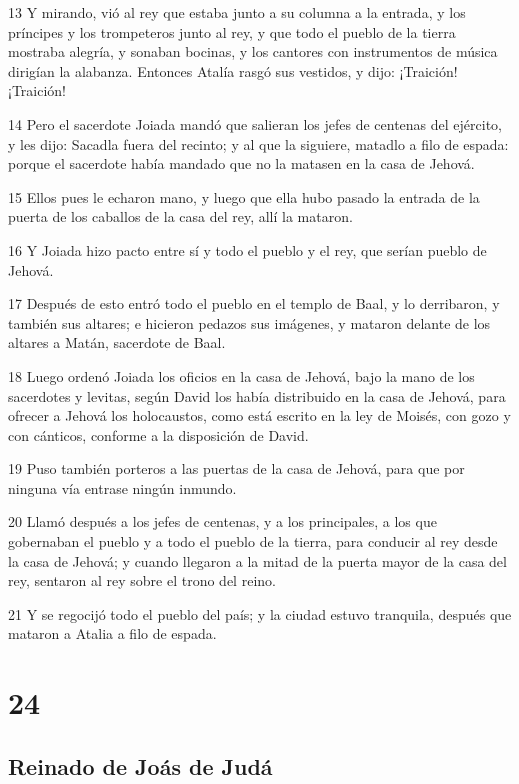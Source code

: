 \par 13 Y mirando, vió al rey que estaba junto a su columna a la entrada, y los príncipes y los trompeteros junto al rey, y que todo el pueblo de la tierra mostraba alegría, y sonaban bocinas, y los cantores con instrumentos de música dirigían la alabanza. Entonces Atalía rasgó sus vestidos, y dijo: ¡Traición! ¡Traición!
\par 14 Pero el sacerdote Joiada mandó que salieran los jefes de centenas del ejército, y les dijo: Sacadla fuera del recinto; y al que la siguiere, matadlo a filo de espada: porque el sacerdote había mandado que no la matasen en la casa de Jehová.
\par 15 Ellos pues le echaron mano, y luego que ella hubo pasado la entrada de la puerta de los caballos de la casa del rey, allí la mataron.
\par 16 Y Joiada hizo pacto entre sí y todo el pueblo y el rey, que serían pueblo de Jehová.
\par 17 Después de esto entró todo el pueblo en el templo de Baal, y lo derribaron, y también sus altares; e hicieron pedazos sus imágenes, y mataron delante de los altares a Matán, sacerdote de Baal.
\par 18 Luego ordenó Joiada los oficios en la casa de Jehová, bajo la mano de los sacerdotes y levitas, según David los había distribuido en la casa de Jehová, para ofrecer a Jehová los holocaustos, como está escrito en la ley de Moisés, con gozo y con cánticos, conforme a la disposición de David.
\par 19 Puso también porteros a las puertas de la casa de Jehová, para que por ninguna vía entrase ningún inmundo.
\par 20 Llamó después a los jefes de centenas, y a los principales, a los que gobernaban el pueblo y a todo el pueblo de la tierra, para conducir al rey desde la casa de Jehová; y cuando llegaron a la mitad de la puerta mayor de la casa del rey, sentaron al rey sobre el trono del reino.
\par 21 Y se regocijó todo el pueblo del país; y la ciudad estuvo tranquila, después que mataron a Atalia a filo de espada.

\chapter{24}

\section*{Reinado de Joás de Judá}

